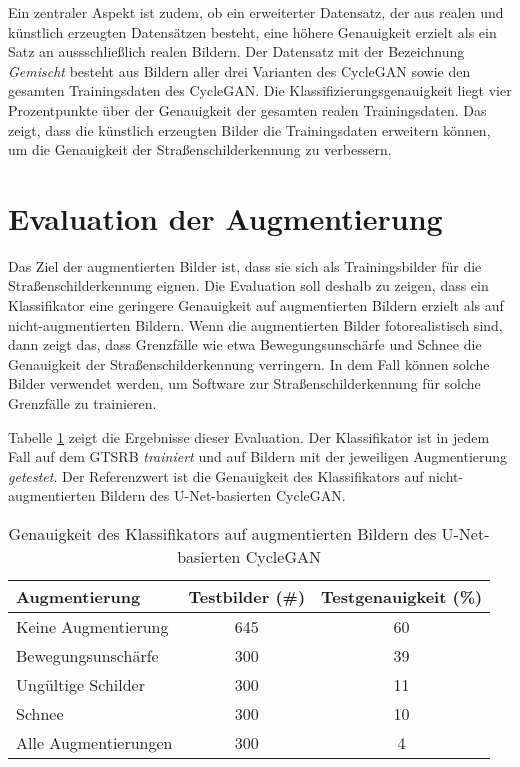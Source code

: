 Ein zentraler Aspekt ist zudem, ob ein erweiterter Datensatz, der aus realen und künstlich erzeugten Datensätzen besteht, eine höhere Genauigkeit erzielt als ein Satz an aussschließlich realen Bildern. Der Datensatz mit der Bezeichnung \emph{Gemischt} besteht aus Bildern aller drei Varianten des \ac{CycleGAN} sowie den gesamten Trainingsdaten des \ac{CycleGAN}. Die Klassifizierungsgenauigkeit liegt vier Prozentpunkte über der Genauigkeit der gesamten realen Trainingsdaten. Das zeigt, dass die künstlich erzeugten Bilder die Trainingsdaten erweitern können, um die Genauigkeit der Straßenschilderkennung zu verbessern.

\section{Evaluation der Augmentierung}

Das Ziel der augmentierten Bilder ist, dass sie sich als Trainingsbilder für die Straßenschilderkennung eignen. Die Evaluation soll deshalb zu zeigen, dass ein Klassifikator eine geringere Genauigkeit auf augmentierten Bildern erzielt als auf nicht-augmentierten Bildern. Wenn die augmentierten Bilder fotorealistisch sind, dann zeigt das, dass Grenzfälle wie etwa Bewegungsunschärfe und Schnee die Genauigkeit der Straßenschilderkennung verringern. In dem Fall können solche Bilder verwendet werden, um Software zur Straßenschilderkennung für solche Grenzfälle zu trainieren.

Tabelle \ref{tab:augmentation-classification-acc} zeigt die Ergebnisse dieser Evaluation. Der Klassifikator ist in jedem Fall auf dem \ac{GTSRB} \emph{trainiert} und auf Bildern mit der jeweiligen Augmentierung \emph{getestet}. Der Referenzwert ist die Genauigkeit des Klassifikators auf nicht-augmentierten Bildern des U-Net-basierten \ac{CycleGAN}.

\begin{table}[h]
	\centering
	\begin{tabular}{|l|c|c|}
	\hline
	Augmentierung & Testbilder (\#) & Testgenauigkeit\tablefootnote{Des Klassifikators auf dieser Augmentierung, wenn er auf dem \ac{GTSRB} trainiert ist} (\%) \\ \hline \hline
	Keine Augmentierung & 645 & 60 \\ \hline \hline
	Bewegungsunschärfe & 300 & 39 \\ \hline
   Ungültige Schilder & 300 & 11 \\ \hline
   Schnee & 300 & 10 \\ \hline \hline
	Alle Augmentierungen & 300 & 4 \\ \hline
	\end{tabular}
	\caption{Genauigkeit des Klassifikators auf augmentierten Bildern des U-Net-basierten \ac{CycleGAN}}
	\label{tab:augmentation-classification-acc}
\end{table}

